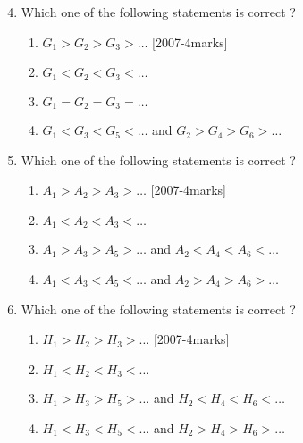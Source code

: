 \documentclass[journal,12pt,twocolumn]{IEEEtran}
\theoremstyle{remark}
\begin{document}
  \begin{enumerate}
  \setcounter{enumi}{3}    
  
 \item Which one of the following statements is correct ?
\begin{enumerate}

 
  \item$G_{1}>G_{2}>G_{3}>\dots$ \hfill[2007-4marks]

 \item$G_{1}<G_{2}<G_{3}<\dots$

\item$G_{1}=G_{2}=G_{3}=\dots$

\item$G_{1}<G_{3}<G_{5}<\dots$ and $G_{2}>G_{4}>G_{6}>\dots$
\end{enumerate}

\item Which one of the following statements is correct ?
\begin{enumerate}
    
\item $A_{1}>A_{2}>A_{3}>\dots$ \hfill[2007-4marks]

\item $A_{1}<A_{2}<A_{3}<\dots$

\item $A_{1}>A_{3}>A_{5}>\dots$ and $A_{2}<A_{4}<A_{6}<\dots$

\item $A_{1}<A_{3}<A_{5}<\dots$ and $A_{2}>A_{4}>A_{6}>\dots$
\end{enumerate}

\item Which one of the following statements is correct ?
\begin{enumerate}

 \item $H_{1}>H_{2}>H_{3}>\dots$ \hfill[2007-4marks]

 \item $H_{1}<H_{2}<H_{3}<\dots$

\item $H_{1}>H_{3}>H_{5}>\dots$ and $H_{2}<H_{4}<H_{6}<\dots$

\item $H_{1}<H_{3}<H_{5}<\dots$ and $H_{2}>H_{4}>H_{6}>\dots$
\end{enumerate}
\end{enumerate}
\end{document}
